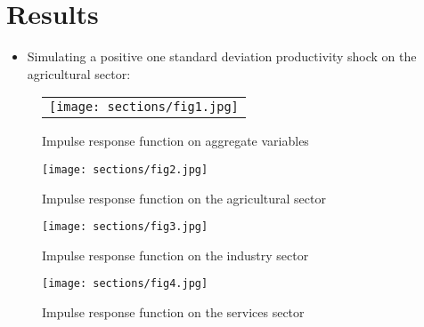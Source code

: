 \section{Results}\label{sec6}
\begin{itemize}
\item Simulating a positive one standard deviation productivity shock on the agricultural sector:
\end{itemize}


\begin{figure}[H]
\centering
\begin{tabular}{c}
\texttt{[image: sections/fig1.jpg]}\\
\end{tabular}
\caption{Impulse response function on aggregate variables}
\label{fig1}
\end{figure}

\begin{figure}[H]
\centering
\texttt{[image: sections/fig2.jpg]}\\

\caption{Impulse response function on the agricultural sector}
\label{fig2}
\end{figure}

\begin{figure}[H]
\centering
\texttt{[image: sections/fig3.jpg]}\\
\caption{Impulse response function on the industry sector}
\label{fig3}
\end{figure}

\begin{figure}[H]
\centering
\texttt{[image: sections/fig4.jpg]}\\
\caption{Impulse response function on the services sector}
\label{fig4}
\end{figure}

